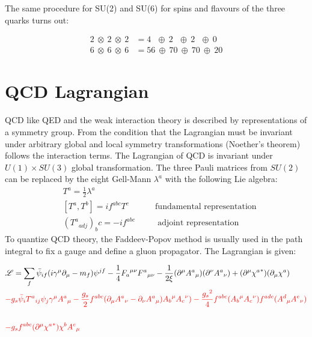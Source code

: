The same procedure for SU(2) and SU(6) for spins and flavours of the three quarks turns out:

\begin{equation}
\begin{split}
2\: \otimes\:2 \:\otimes\:2 &= 4 \:\:\:\oplus\: 2\:\:\:\oplus\:2\:\:\:\oplus\:0\\
6\: \otimes\:6 \:\otimes\:6&= 56 \:\oplus\: 70\:\oplus\:70\:\oplus\:20
\end{split}
\end{equation}


\pagebreak
\section{QCD Lagrangian}
\label{QCD Lagrangian}

QCD like QED and the weak interaction theory is described by representations of a symmetry group. From the condition that the Lagrangian must be invariant under arbitrary global and local symmetry transformations (Noether’s theorem) follows the interaction terms.
The Lagrangian of QCD is invariant under $ U(1) \times SU(3) $ global transformation. The three Pauli matrices from $ SU(2) $ can be replaced by the eight Gell-Mann $ \lambda^a $ with the following Lie algebra: 
\begin{equation}
\begin{split}
&T^a = \frac{1}{2} \lambda^a\\
&[T^a, T^b]= if^{abc} T^c \:\:\:\:\:\:\:\:\:\:\:\:\:\:\text{fundamental representation}\\
&({T^a}_{adj})_bc = -if^{abc} \:\:\:\:\:\:\:\:\:\:\:\:\text{adjoint representation}
\end{split}
\end{equation}
To quantize QCD theory, the Faddeev-Popov method \cite{Faddeev:1967fc} is usually used in the path integral to fix a gauge and define a gluon propagator. The Lagrangian is given:

\begin{equation}
\begin{split}
& \mathscr{L} = \sum_f \bar{\psi}_{if} (i\gamma^{\mu} {\partial}_{\mu}-m_f){\psi}^{jf}-\frac{1}{4}{F_a}^{\mu \nu}{F^a}_{\mu \nu}-\frac{1}{2\xi}(\partial^{\mu} {A^a}_{\mu})(\partial^{\nu} {A^a}_{\nu})+(\partial^{\mu} {\chi^a}^*)(\partial_{\mu} {\chi^a})\\
&{\color[RGB]{255,0,0} -g_s \bar{\psi}_{i} {T^a}_{ij}{\psi}_{j} \gamma^{\mu} {A^a}_{\mu}-\frac{g_s}{2} f^{abc}(\partial_{\mu} {A^a}_{\nu}-\partial_{\nu} {A^a}_{\mu}){A_b}^{\mu}{A_c}^{\nu})-\frac{{g_s}^2}{4} f^{abc} ({A_b}^{\mu}{A_c}^{\nu})f^{ade} ({A^d}_{\mu} {A^e}_{\nu})}\\
\\
&{\color[RGB]{255,0,0} -g_s f^{abc} (\partial^{\mu} {\chi^a}^{*}){\chi^b}{A^c}_{\mu}}\\
\end{split}
\end{equation}

